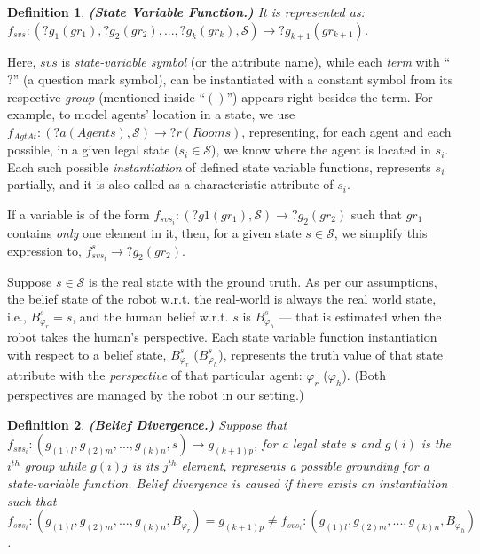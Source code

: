 \documentclass[letterpaper]{article} %
\newtheorem{definition}{Definition}
\begin{document}
\begin{definition}
\textbf{(State Variable Function.)} It is represented as: $f_{svs}:(?g_1 (gr_1), ?g_2 (gr_2), ..., ?g_k (gr_k),\mathcal{S})\rightarrow ?g_{k+1} (gr_{k+1})$. 
\end{definition}
Here, $svs$ is \textit{state-variable symbol} (or the attribute name), while each \textit{term} with ``$?$'' (a question mark symbol), can be instantiated with a constant symbol from its respective \textit{group} (mentioned inside ``$()$'') appears right besides the term. 
For example, to model agents' location in a state, we use $f_{\textit{AgtAt}}:(?a (Agents), \mathcal{S}) \rightarrow ?r (Rooms)$, representing, for each agent and each possible, in a given legal state ($s_i \in \mathcal{S}$), we know where the agent is located in $s_i$. 
Each such possible \textit{instantiation} of defined state variable functions, represents $s_i$ partially, and it is also called as a characteristic attribute of $s_i$.     

If a variable is of the form $f_{svs_i}: (?g1 (gr_1), \mathcal{S}) \rightarrow ?g_2 (gr_2)$ such that $gr_1$ contains \textit{only} one element in it, then, for a given state $s \in \mathcal{S}$, we simplify this expression to, $f_{svs_i}^{s} \rightarrow ?g_2 (gr_2)$. 

Suppose $s \in \mathcal{S}$ is the real state with the ground truth. As per our assumptions, the belief state of the robot w.r.t. the real-world is always the real world state, i.e., $B_{\varphi_r}^s = s$, and the human belief w.r.t. $s$ is $B_{\varphi_h}^s$ --- that is estimated when the robot takes the human's perspective. Each state variable function instantiation with respect to a belief state, $B_{\varphi_r}^s$ ($B_{\varphi_h}^s$), represents the truth value of that state attribute with the \textit{perspective} of that particular agent: $\varphi_r$ ($\varphi_h$). (Both perspectives are managed by the robot in our setting.) 

\begin{definition}
\textbf{(Belief Divergence.)}
Suppose that $f_{\textit{svs}_i}:(g_{(1)l},g_{(2)m},...,g_{(k)n},s) \rightarrow g_{(k+1)p}$, for a legal state $s$ and $g(i)$ is the $i^{th}$ group while $g(i)j$ is its $j^{th}$ element, represents a possible {\em grounding} for a state-variable function.
Belief divergence is caused if there exists an instantiation such that $f_{\textit{svs}_i}:(g_{(1)l},g_{(2)m},...,g_{(k)n},B_{\varphi_r}) = {g_{(k+1)p}}  \neq f_{\textit{svs}_i}:(g_{(1)l},g_{(2)m},...,g_{(k)n},B_{\varphi_h})$.
\end{definition} 
\end{document}
